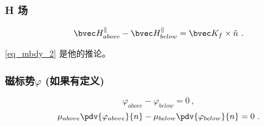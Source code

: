 \subsubsection{H 场}
\begin{equation}
\bvec H^\parallel_{above} - \bvec H^\parallel_{below} = \bvec K_f \times \hat n~.
\end{equation}

\autoref{eq_mbdy_2}  是他的推论。


\subsubsection{磁标势$\varphi$ (如果有定义)}
\begin{equation}
\varphi_{above}-\varphi_{below}=0~,
\end{equation}
\begin{equation}
\mu_{above}\pdv{\varphi_{above}}{n} - \mu_{below}\pdv{\varphi_{below}}{n}  = 0~.
\end{equation}

